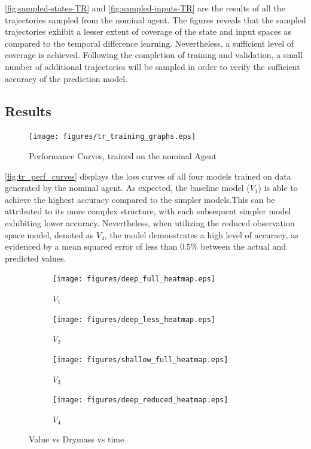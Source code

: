 \autoref{fig:sampled-states-TR} and \autoref{fig:sampled-inputs-TR} are the results of all the trajectories sampled from the nominal agent. The figures reveals that the sampled trajectories exhibit a lesser extent of coverage of the state and input spaces as compared to the temporal difference learning. Nevertheless, a sufficient level of coverage is achieved. Following the completion of training and validation, a small number of additional trajectories will be sampled in order to verify the sufficient accuracy of the prediction model.


\subsection{Results}

\begin{figure}[H]
    \centering
    \texttt{[image: figures/tr\_training\_graphs.eps]}
    \caption{Performance Curves, trained on the nominal Agent}
    \label{fig:tr_perf_curves}
\end{figure}


\autoref{fig:tr_perf_curves} displays the loss curves of all four models trained on data generated by the nominal agent. As expected, the baseline model ($V_1$) is able to achieve the highest accuracy compared to the simpler models.This can be attributed to its more complex structure, with each subsequent simpler model exhibiting lower accuracy. Nevertheless, when utilizing the reduced observation space model, denoted as $V_4$, the model demonstrates a high level of accuracy, as evidenced by a mean squared error of less than $0.5\%$ between the actual and predicted values.

\begin{figure}[H]
	\centering
	\begin{subfigure}[b]{0.49\textwidth}
		\centering
		\texttt{[image: figures/deep\_full\_heatmap.eps]}
		\caption{$V_1$}
		\label{fig:v1_heatmap}
	\end{subfigure}
	\hfill
	\begin{subfigure}[b]{0.49\textwidth}
		\centering
		\texttt{[image: figures/deep\_less\_heatmap.eps]}
		\caption{$V_2$}
		\label{fig:v2_heatmap}
	\end{subfigure}
	\vfill
	\begin{subfigure}[b]{0.49\textwidth}
		\centering
		\texttt{[image: figures/shallow\_full\_heatmap.eps]}
		\caption{$V_3$}
		\label{fig:v3_heatmap}
	\end{subfigure}
	\hfill
	\begin{subfigure}[b]{0.49\textwidth}
		\centering
		\texttt{[image: figures/deep\_reduced\_heatmap.eps]}
		\caption{$V_4$}
		\label{fig:v4_heatmap}
	\end{subfigure}
	\caption{Value vs Drymass vs time}
	\label{fig:vf_heatmaps}
\end{figure}


